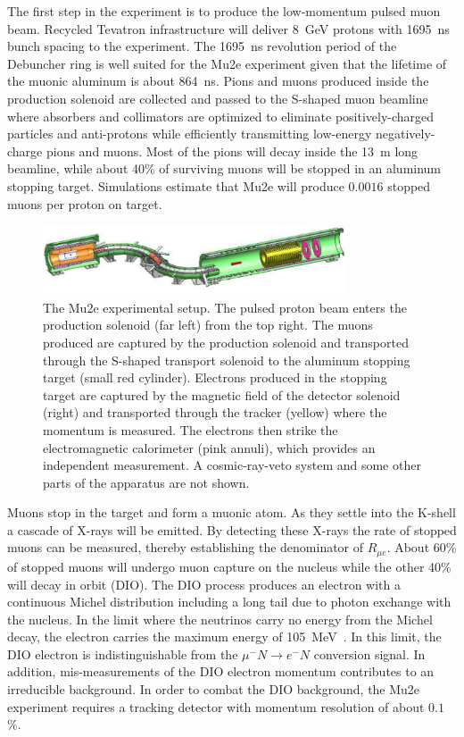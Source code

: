 The first step in the experiment is to produce the low-momentum pulsed
muon beam.  Recycled Tevatron infrastructure will deliver 8~GeV
protons with 1695~ns bunch spacing to the experiment.  The 1695~ns
revolution period of the Debuncher ring is well suited for the Mu2e
experiment given that the lifetime of the muonic aluminum is about
864~ns.  Pions and muons produced inside the production solenoid are
collected and passed to the S-shaped muon beamline where absorbers and
collimators are optimized to eliminate positively-charged particles
and anti-protons while efficiently transmitting low-energy
negatively-charge pions and muons.  Most of the pions will decay
inside the 13~m long beamline, while about 40\% of surviving muons
will be stopped in an aluminum stopping target.  Simulations estimate
that Mu2e will produce $0.0016$ stopped muons per proton on target.



\begin{figure}
\centering
\includegraphics[width=0.8\textwidth]{ChargedLeptons/Figures/mu2edisk_scaled.pdf}
\caption{The Mu2e experimental setup. The pulsed proton beam enters
the production solenoid (far left) from the top right.  The muons
produced are captured by the production solenoid and transported
through the S-shaped transport solenoid to the aluminum stopping
target (small red cylinder).  Electrons produced in the stopping
target are captured by the magnetic field of the detector solenoid
(right) and transported through the tracker (yellow) where the
momentum is measured.  The electrons then strike the electromagnetic
calorimeter (pink annuli), which provides an independent measurement.
A cosmic-ray-veto system and some other parts of the apparatus are not
shown.
}
\label{cl:fig:mu2e}
\end{figure}



Muons stop in the target and form a muonic atom.  As they settle into
the K-shell a cascade of X-rays will be emitted.  By detecting these
X-rays the rate of stopped muons can be measured, thereby establishing
the denominator of $R_{\mu e}$. About 60\% of stopped muons will
undergo muon capture on the nucleus while the other 40\% will decay in
orbit (DIO).  The DIO process produces an electron with a continuous
Michel distribution including a long tail due to photon exchange with
the nucleus.  In the limit where the neutrinos carry no energy from
the Michel decay, the electron carries the maximum energy of 105~MeV~\cite{czarnecki}.
In this limit, the DIO electron is indistinguishable from the $\mu^-N
\rightarrow e^-N$ conversion signal.  In addition, mis-measurements of
the DIO electron momentum contributes to an irreducible background.
In order to combat the DIO background, the Mu2e experiment requires a
tracking detector with momentum resolution of about $0.1$\%.


